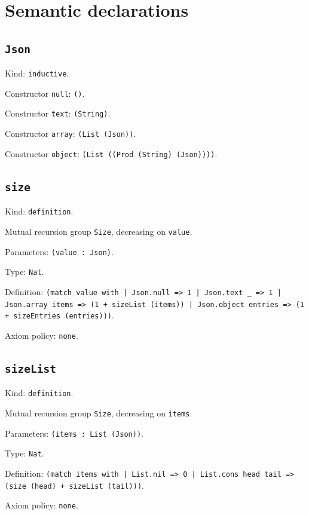 \documentclass[11pt]{article}
\begin{document}
\section*{Semantic declarations}
\subsection*{\texttt{Json}}
\noindent Kind: \texttt{inductive}.\par
\noindent Constructor \texttt{null}: \texttt{()}.\par
\noindent Constructor \texttt{text}: \texttt{(String)}.\par
\noindent Constructor \texttt{array}: \texttt{(List (Json))}.\par
\noindent Constructor \texttt{object}: \texttt{(List ((Prod (String) (Json))))}.\par
\subsection*{\texttt{size}}
\noindent Kind: \texttt{definition}.\par
\noindent Mutual recursion group \texttt{Size}, decreasing on \texttt{value}.\par
\noindent Parameters: \texttt{(value : Json)}.\par
\noindent Type: \texttt{Nat}.\par
\noindent Definition: \texttt{(match value with | Json.null => 1 | Json.text \_ => 1 | Json.array items => (1 + sizeList (items)) | Json.object entries => (1 + sizeEntries (entries)))}.\par
\noindent Axiom policy: \texttt{none}.\par
\subsection*{\texttt{sizeList}}
\noindent Kind: \texttt{definition}.\par
\noindent Mutual recursion group \texttt{Size}, decreasing on \texttt{items}.\par
\noindent Parameters: \texttt{(items : List (Json))}.\par
\noindent Type: \texttt{Nat}.\par
\noindent Definition: \texttt{(match items with | List.nil => 0 | List.cons head tail => (size (head) + sizeList (tail)))}.\par
\noindent Axiom policy: \texttt{none}.\par
\end{document}
